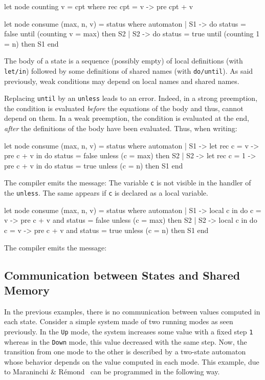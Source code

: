 \documentclass[11pt,titlepage,twoside]{report}
\newenvironment{sample}
  {\begin{flushright}\begin{minipage}[t]{15cm}\begin{alltt}}
  {\end{alltt}\end{minipage}\end{flushright}}
\begin{document}
\begin{runverbatim}
let node counting v = cpt where
  rec cpt = v -> pre cpt + v

let node consume (max, n, v) = status where
  automaton
  | S1 ->
       do status = false
       until (counting v = max) then S2
  | S2 ->
       do status = true
       until (counting 1 = n) then S1
  end
\end{runverbatim}
The body of a state is a sequence (possibly empty) of local
definitions (with \verb-let/in-) followed by some definitions of
shared names (with \verb-do/until-). As said previously, weak
conditions may depend on local names and shared names.

Replacing \verb-until- by an \verb-unless- leads to an error. Indeed,
in a strong preemption, the condition is evaluated {\em before} the
equations of the body and thus, cannot depend on them. In a weak
preemption, the condition is evaluated at the end, {\em after} the
definitions of the body have been evaluated. Thus, when writing:

\begin{runverbatim}[fail]
let node consume (max, n, v) = status where
  automaton
  | S1 ->
      let rec c = v -> pre c + v in
      do status = false
      unless (c = max) then S2
  | S2 ->
      let rec c = 1 -> pre c + v in
      do status = true
      unless (c = n) then S1
  end
\end{runverbatim}
The compiler emits the message:
\runverbatimerr{}
The variable \verb-c- is not visible in the handler of the \verb-unless-. The
same appears if \verb-c- is declared as a local variable.

\begin{runverbatim}[fail]
let node consume (max, n, v) = status where
  automaton
  | S1 ->
      local c in
      do c = v -> pre c + v and status = false
      unless (c = max) then S2
  | S2 ->
      local c in
      do c = v -> pre c + v and status = true
      unless (c = n) then S1
  end
\end{runverbatim}
The compiler emits the message:
\runverbatimerr{}
\subsection{Communication between States and Shared Memory}
In the previous examples, there is no communication between values
computed in each state. Consider a simple system made of two running
modes as seen previously. In the \verb-Up- mode, the system increases
some value with a fixed step \verb-1- whereas in the \verb-Down- mode,
this value decreased with the same step. Now, the transition from one
mode to the other is described by a two-state automaton whose behavior
depends on the value computed in each mode. This example, due to
Maraninchi \& R\'emond~\cite{Modes-SCP03} can be programmed in the
following way.
\end{document}
